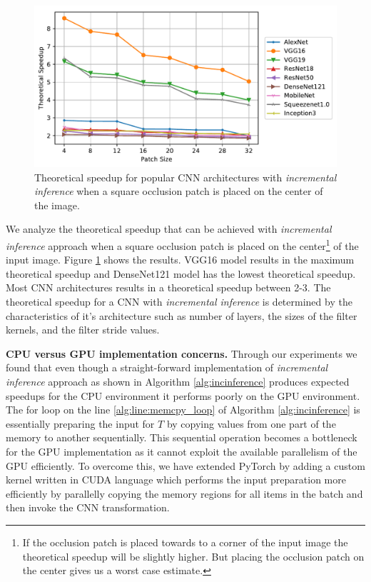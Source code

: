 \begin{figure}[t]
\includegraphics[width=\columnwidth]{images/redundancy_ratio}
\caption{Theoretical speedup for popular CNN architectures with \textit{incremental inference} when a square occlusion patch is placed on the center of the image.}
\label{fig:redundancy_ratio}
\end{figure}

We analyze the theoretical speedup that can be achieved with \textit{incremental inference} approach when a square occlusion patch is placed on the center\footnote{If the occlusion patch is placed towards to a corner of the input image the theoretical speedup will be slightly higher. But placing the occlusion patch on the center gives us a worst case estimate.} of the input image. Figure \ref{fig:redundancy_ratio} shows the results. VGG16 model results in the maximum theoretical speedup and DenseNet121 model has the lowest theoretical speedup. Most CNN architectures results in a theoretical speedup between 2-3. The theoretical speedup for a CNN with \textit{incremental inference} is determined by the characteristics of it's architecture such as number of layers, the sizes of the filter kernels, and the filter stride values.


\vspace{2mm}
\noindent \textbf{CPU versus GPU implementation concerns.}
Through our experiments we found that even though a straight-forward implementation of \textit{incremental inference} approach as shown in Algorithm \ref{alg:incinference} produces expected speedups for the CPU environment it performs poorly on the GPU environment.
The for loop on the line \ref{alg:line:memcpy_loop} of Algorithm \ref{alg:incinference} is essentially preparing the input for $T$ by copying values from one part of the memory to another sequentially.
This sequential operation becomes a bottleneck for the GPU implementation as it cannot exploit the available parallelism of the GPU efficiently.
To overcome this, we have extended PyTorch by adding a custom kernel written in CUDA language which performs the input preparation more efficiently by parallelly copying the memory regions for all items in the batch and then invoke the CNN transformation.

